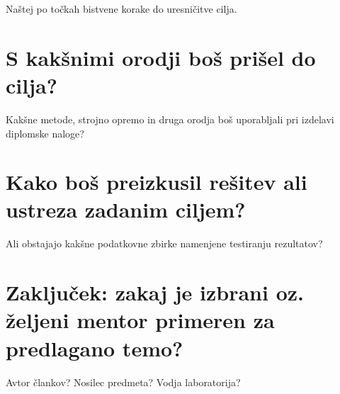 \documentclass[11pt,a4paper]{article}
\begin{document}
Naštej po točkah bistvene korake do uresničitve cilja.


\section{S kakšnimi orodji boš prišel do cilja?}

Kakšne metode, strojno opremo in druga orodja boš uporabljali pri izdelavi diplomske naloge?


\section{Kako boš preizkusil rešitev ali ustreza zadanim ciljem?}

Ali obstajajo kakšne podatkovne zbirke namenjene testiranju rezultatov?


\section{Zaključek: zakaj je izbrani oz. željeni mentor primeren za predlagano temo?}

Avtor člankov? Nosilec predmeta? Vodja laboratorija?

\printbibliography
\end{document}
